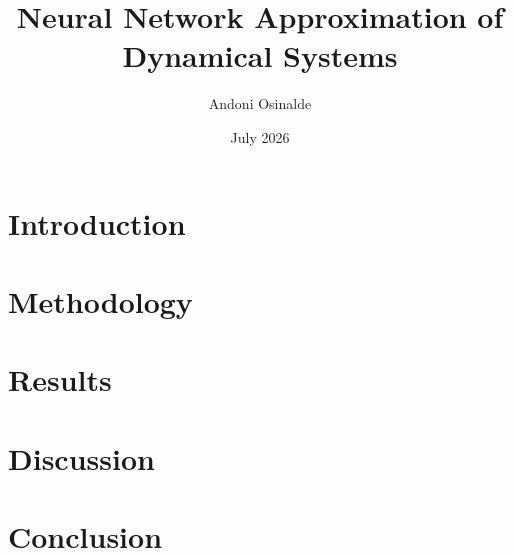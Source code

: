 \documentclass[11pt]{article}
\title{Neural Network Approximation of Dynamical Systems}
\author{Andoni Osinalde}
\date{July 2026}
\begin{document}
\maketitle
\begin{abstract}

\end{abstract}
\section{Introduction}

\section{Methodology}

\section{Results}

\FloatBarrier
\section{Discussion}

\section{Conclusion}



\end{document}
